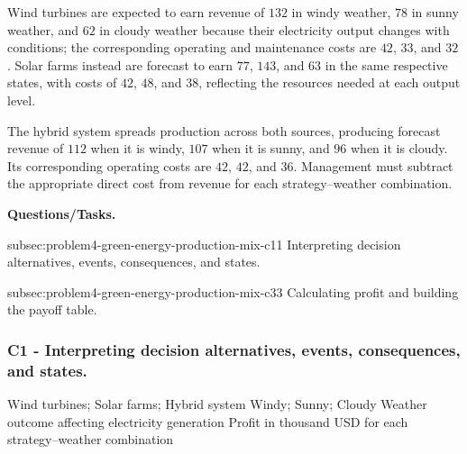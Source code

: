 	Wind turbines are expected to earn revenue of \(132\) in windy weather, \(78\) in sunny weather, and \(62\) in cloudy weather because their electricity output changes with conditions; the corresponding operating and maintenance costs are \(42\), \(33\), and \(32\). Solar farms instead are forecast to earn \(77\), \(143\), and \(63\) in the same respective states, with costs of \(42\), \(48\), and \(38\), reflecting the resources needed at each output level.

	The hybrid system spreads production across both sources, producing forecast revenue of \(112\) when it is windy, \(107\) when it is sunny, and \(96\) when it is cloudy. Its corresponding operating costs are \(42\), \(42\), and \(36\). Management must subtract the appropriate direct cost from revenue for each strategy--weather combination.

	\textbf{Questions/Tasks.}
	\begin{enumerate}
		\CriterionTask
		{subsec:problem4-green-energy-production-mix-c1}{1}
		{Interpreting decision alternatives, events, consequences, and states.}

		\CriterionTask
		{subsec:problem4-green-energy-production-mix-c3}{3}
		{Calculating profit and building the payoff table.}
	\end{enumerate}

	\subsubsection*{C1 - Interpreting decision alternatives, events, consequences, and states.}
	\label{subsec:problem4-green-energy-production-mix-c1}

	\DecisionElementsTable
	{Wind turbines; Solar farms; Hybrid system}
	{Windy; Sunny; Cloudy}
	{Weather outcome affecting electricity generation}
	{Profit in thousand USD for each strategy--weather combination}


